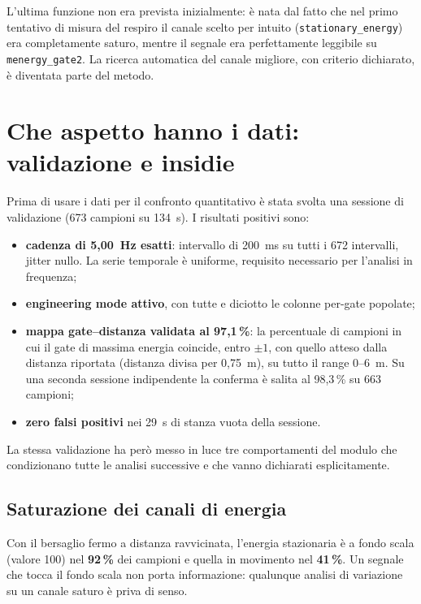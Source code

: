 L'ultima funzione non era prevista inizialmente: è nata dal fatto che nel primo
tentativo di misura del respiro il canale scelto per intuito
(\texttt{stationary\_energy}) era completamente saturo, mentre il segnale era
perfettamente leggibile su \texttt{menergy\_gate2}. La ricerca automatica del
canale migliore, con criterio dichiarato, è diventata parte del metodo.

\section{Che aspetto hanno i dati: validazione e insidie}
\label{sec:insidie}

Prima di usare i dati per il confronto quantitativo è stata svolta una sessione di
validazione (673 campioni su 134~s). I risultati positivi sono:

\begin{itemize}[leftmargin=1.4em,itemsep=2pt]
  \item \textbf{cadenza di 5,00~Hz esatti}: intervallo di 200~ms su tutti i 672
        intervalli, jitter nullo. La serie temporale è uniforme, requisito
        necessario per l'analisi in frequenza;
  \item \textbf{engineering mode attivo}, con tutte e diciotto le colonne per-gate
        popolate;
  \item \textbf{mappa gate--distanza validata al 97,1\,\%}: la percentuale di
        campioni in cui il gate di massima energia coincide, entro $\pm 1$, con
        quello atteso dalla distanza riportata (distanza divisa per 0,75~m), su
        tutto il range 0--6~m. Su una seconda sessione indipendente la conferma è
        salita al 98,3\,\% su 663 campioni;
  \item \textbf{zero falsi positivi} nei 29~s di stanza vuota della sessione.
\end{itemize}

La stessa validazione ha però messo in luce tre comportamenti del modulo che
condizionano tutte le analisi successive e che vanno dichiarati esplicitamente.

\subsection{Saturazione dei canali di energia}
\label{sec:saturazione}

Con il bersaglio fermo a distanza ravvicinata, l'energia stazionaria è a fondo
scala (valore 100) nel \textbf{92\,\%} dei campioni e quella in movimento nel
\textbf{41\,\%}. Un segnale che tocca il fondo scala non porta informazione:
qualunque analisi di variazione su un canale saturo è priva di senso.

